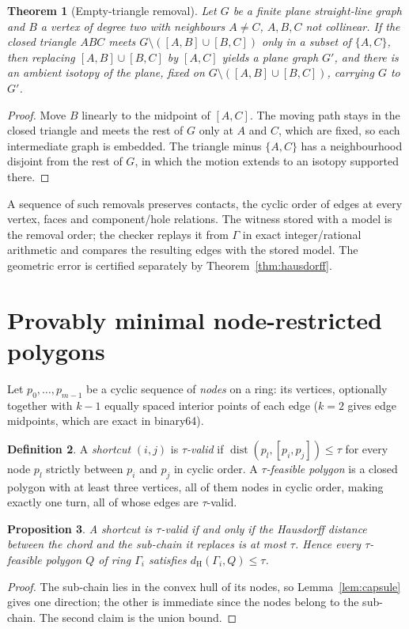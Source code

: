 \documentclass[11pt,a4paper]{article}
\newtheorem{theorem}{Theorem}
\newtheorem{proposition}[theorem]{Proposition}
\theoremstyle{definition}
\newtheorem{definition}[theorem]{Definition}
\theoremstyle{remark}
\newcommand{\dH}{d_{\mathrm{H}}}
\newcommand{\dist}{\operatorname{dist}}
\newcommand{\seg}[2]{[#1,#2]}
\begin{document}
\begin{theorem}[Empty-triangle removal]\label{thm:triangle}
Let $G$ be a finite plane straight-line graph and $B$ a vertex of degree two
with neighbours $A\ne C$, $A,B,C$ not collinear. If the closed triangle $ABC$
meets $G\setminus(\seg AB\cup\seg BC)$ only in a subset of $\{A,C\}$, then
replacing $\seg AB\cup\seg BC$ by $\seg AC$ yields a plane graph $G'$, and
there is an ambient isotopy of the plane, fixed on
$G\setminus(\seg AB\cup\seg BC)$, carrying $G$ to $G'$.
\end{theorem}
\begin{proof}
Move $B$ linearly to the midpoint of $\seg AC$. The moving path stays in the
closed triangle and meets the rest of $G$ only at $A$ and $C$, which are fixed,
so each intermediate graph is embedded. The triangle minus $\{A,C\}$ has a
neighbourhood disjoint from the rest of $G$, in which the motion extends to an
isotopy supported there.
\end{proof}

A sequence of such removals preserves contacts, the cyclic order of edges at
every vertex, faces and component/hole relations. The witness stored with a
model is the removal order; the checker replays it from $\Gamma$ in exact
integer/rational arithmetic and compares the resulting edges with the stored
model. The geometric error is certified separately by
Theorem~\ref{thm:hausdorff}.

\section{Provably minimal node-restricted polygons}

Let $p_0,\dots,p_{m-1}$ be a cyclic sequence of \emph{nodes} on a ring: its
vertices, optionally together with $k-1$ equally spaced interior points of
each edge ($k=2$ gives edge midpoints, which are exact in binary64).

\begin{definition}
A \emph{shortcut} $(i,j)$ is \emph{$\tau$-valid} if
$\dist(p_l,\seg{p_i}{p_j})\le\tau$ for every node $p_l$ strictly between $p_i$
and $p_j$ in cyclic order. A \emph{$\tau$-feasible polygon} is a closed polygon
with at least three vertices, all of them nodes in cyclic order, making exactly
one turn, all of whose edges are $\tau$-valid.
\end{definition}

\begin{proposition}\label{prop:capsule-chain}
A shortcut is $\tau$-valid if and only if the Hausdorff distance between the
chord and the sub-chain it replaces is at most $\tau$. Hence every
$\tau$-feasible polygon $Q$ of ring $\Gamma_i$ satisfies
$\dH(\Gamma_i,Q)\le\tau$.
\end{proposition}
\begin{proof}
The sub-chain lies in the convex hull of its nodes, so
Lemma~\ref{lem:capsule} gives one direction; the other is immediate since the
nodes belong to the sub-chain. The second claim is the union bound.
\end{proof}
\end{document}
